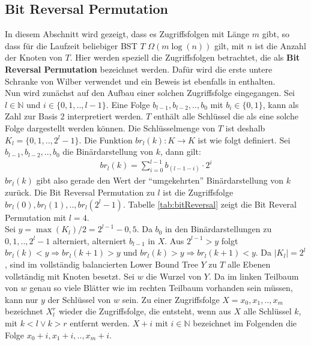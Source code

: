 \documentclass[a4paper,12pt]{article}
\begin{document}
\subsection{Bit Reversal Permutation } \label{abschnittBitReversal}
In diesem Abschnitt wird gezeigt, dass es Zugriffsfolgen mit Länge $m$ gibt, so dass für die Laufzeit beliebiger BST $T$ $\Omega\left(m \log\left( n\right)\right)$ gilt, mit $n$ ist die Anzahl der Knoten von $T$. Hier werden speziell die Zugriffsfolgen betrachtet, die als \textbf{Bit Reversal Permutation} bezeichnet werden. 
Dafür wird die erste untere Schranke von Wilber verwendet und ein Beweis ist ebenfalls in \cite{wilberLowerBounds} enthalten. \\
Nun wird zunächst auf den Aufbau einer solchen Zugriffsfolge eingegangen. Sei $l \in \mathbb{N}$ und $i \in \{0,1,..,l-1\}$. Eine Folge  $b_{l-1},b_{l-2},..,b_0$ mit $b_i \in \{0,1\}$, kann als Zahl zur Basis $2$ interpretiert werden. $T$ enthält alle Schlüssel die als eine solche Folge dargestellt werden können. Die Schlüsselmenge von $T$ ist deshalb $K_l = \{0,1,..,2^l -1\}$. 
Die Funktion $\mathit{br}_l(k)\colon K \rightarrow K$ ist wie folgt definiert. Sei {$b_{l-1},b_{l-2},..,b_{0}$} die Binärdarstellung von $k$, dann gilt:
\begin{align*}
\mathit{br}_l(k) = \sum_{i = 0}^{l-1} b_{\left(l-1-i\right)} \cdot 2^i
\end{align*}
$\mathit{br}_l(k)$ gibt also gerade den Wert der \enquote{umgekehrten} Binärdarstellung von $k$ zurück. Die Bit Reversal Permutation zu $l$ ist die Zugriffsfolge\\ ${\mathit{br}_l(0),\mathit{br}_l(1),..,\mathit{br}_l(2^l-1)}$. Tabelle \ref{tab:bitReversal} zeigt die Bit Reveral Permutation mit $l  = 4$.\\
 Sei $y = \max\left(K_l\right) /2 = 2^{l-1} - 0,5 $. Da $b_0$ in den Binärdarstellungen zu $0, 1,.., 2^l-1$ alterniert, alterniert $b_{l-1}$ in $X$. Aus $2^{l-1} > y$ folgt \\ $\mathit{br}_l(k) < y \Rightarrow \mathit{br}_l(k +1) > y$ und $\mathit{br}_l(k) > y \Rightarrow \mathit{br}_l(k +1) < y$. Da $\vert K_l \vert = 2^l$, sind im vollständig balancierten Lower Bound Tree $Y$ zu $T$ alle Ebenen vollständig mit Knoten besetzt. Sei $w$ die Wurzel von $Y$. Da im linken Teilbaum von $w$ genau so viele Blätter wie im rechten Teilbaum vorhanden sein müssen, kann nur $y$ der Schlüssel von $w$ sein. Zu einer Zugriffsfolge $X = x_0,x_1,..,x_m$ bezeichnet $X^r_l$ wieder die Zugriffsfolge, die entsteht, wenn aus $X$ alle Schlüssel $k$, mit $k < l \lor k > r$ entfernt werden. $X + i$ mit $i \in \mathbb{N}$ bezeichnet im Folgenden die Folge $x_0 + i, x_1 + i,.., x_m + i$.\\
\end{document}
